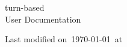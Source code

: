 \documentclass[a4paper,11pt,extrafontsizes,openany,oneside]{memoir}
\begin{document}
\frontmatter

\begin{titlingpage}
    \begin{center}
        \vspace*{50pt}

        {\HUGE\ttfamily turn-based\\[\baselineskip]}
        {\huge User Documentation}

        \vfill

        {\Large Last modified on\ \today\ at\ \printtime}
    \end{center}
\end{titlingpage}

\clearpage
\setcounter{tocdepth}{1}%
\tableofcontents

\clearpage
\listoftables
\clearpage
\listoftodos

\mainmatter





\backmatter
\printindex
\end{document}
